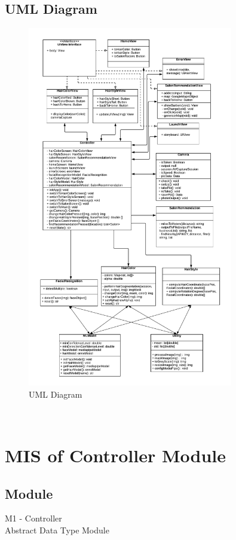\documentclass[12pt, titlepage]{article}
\begin{document}
\subsection{UML Diagram}
\begin{center}
\begin{figure}[]
\includegraphics[width=0.8\textwidth, scale=0.8, keepaspectratio]{Design/SoftArchitecture/UML.png}
\caption{UML Diagram}
\label{FigUH} 
\end{figure}
\end{center}

~\newpage

\section{MIS of Controller Module}

\subsection{Module}
M1 - Controller \\
Abstract Data Type Module
\end{document}
